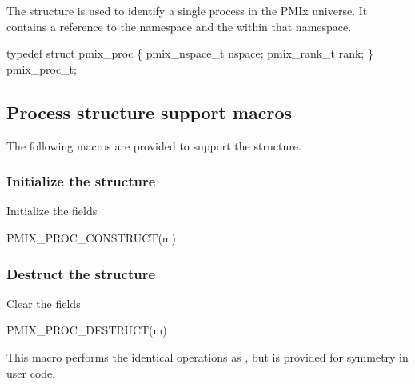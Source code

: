 The  structure is used to identify a single process in the PMIx universe.
It contains a reference to the namespace and the  within that namespace.

\cspecificstart
\begin{codepar}
typedef struct pmix_proc \{
    pmix_nspace_t nspace;
    pmix_rank_t rank;
\} pmix_proc_t;
\end{codepar}
\cspecificend

\subsection{Process structure support macros}
The following macros are provided to support the  structure.

\subsubsection{Initialize the  structure}

Initialize the  fields

\cspecificstart
\begin{codepar}
PMIX_PROC_CONSTRUCT(m)
\end{codepar}
\cspecificend

\begin{arglist}
\end{arglist}

\subsubsection{Destruct the  structure}

Clear the  fields

\cspecificstart
\begin{codepar}
PMIX_PROC_DESTRUCT(m)
\end{codepar}
\cspecificend

\begin{arglist}
\end{arglist}

This macro performs the identical operations as , but is provided for symmetry in user code.


